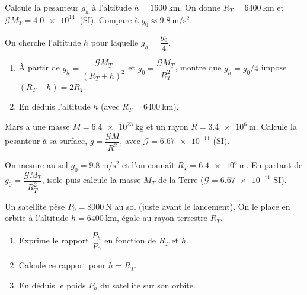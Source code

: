 \documentclass[11pt,a4paper]{article}
\begin{document}

\begin{exo}
Calcule la pesanteur $g_h$ à l'altitude $h=\qty{1600}{\kilo\metre}$.
On donne $R_T=\qty{6400}{\kilo\metre}$ et $\mathcal{G}M_T=\qty{4.0e14}{}$ (SI).
Compare à $g_0\approx\qty{9.8}{\metre\per\second\squared}$.
\end{exo}

\begin{exo}
On cherche l'altitude $h$ pour laquelle $g_h=\dfrac{g_0}{4}$.
\begin{enumerate}[label=\alph*)]
  \item À partir de $g_h=\dfrac{\mathcal{G}M_T}{(R_T+h)^2}$ et $g_0=\dfrac{\mathcal{G}M_T}{R_T^2}$,
        montre que $g_h=g_0/4$ impose $(R_T+h)=2R_T$.
  \item En déduis l'altitude $h$ (avec $R_T=\qty{6400}{\kilo\metre}$).
\end{enumerate}
\end{exo}

\begin{exo}
Mars a une masse $M=\qty{6.4e23}{\kilogram}$ et un rayon $R=\qty{3.4e6}{\metre}$.
Calcule la pesanteur à sa surface, $g=\dfrac{\mathcal{G}M}{R^2}$, avec
$\mathcal{G}=\num{6.67e-11}$ (SI).
\end{exo}

\begin{exo}
On mesure au sol $g_0=\qty{9.8}{\metre\per\second\squared}$ et l'on connaît
$R_T=\qty{6.4e6}{\metre}$. En partant de $g_0=\dfrac{\mathcal{G}M_T}{R_T^2}$, isole puis
calcule la masse $M_T$ de la Terre ($\mathcal{G}=\num{6.67e-11}$ SI).
\end{exo}

\begin{exo}
Un satellite pèse $P_0=\qty{8000}{\newton}$ au sol (juste avant le lancement). On le
place en orbite à l'altitude $h=\qty{6400}{\kilo\metre}$, égale au rayon terrestre
$R_T$.
\begin{enumerate}[label=\alph*)]
  \item Exprime le rapport $\dfrac{P_h}{P_0}$ en fonction de $R_T$ et $h$.
  \item Calcule ce rapport pour $h=R_T$.
  \item En déduis le poids $P_h$ du satellite sur son orbite.
\end{enumerate}
\end{exo}
\end{document}
